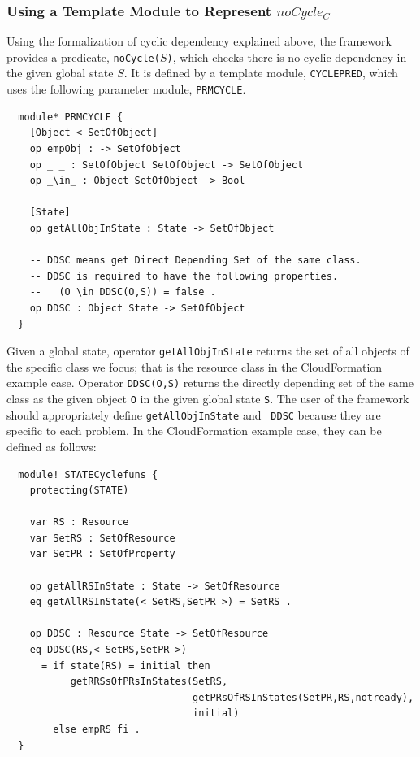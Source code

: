 \documentclass[12pt]{report}
\newcommand{\stt}[1]{{\small{\tt {#1}}}}
\begin{document}
\subsubsection{Using a Template Module to Represent $noCycle_C$}
Using the formalization of cyclic dependency explained above, the
framework provides a predicate, \stt{noCycle($S$)}, which checks there
is no cyclic dependency in the given global state $S$. It is defined
by a template module, {\tt CYCLEPRED}, which uses the following
parameter module, {\tt PRMCYCLE}.
\small
\begin{verbatim}
  module* PRMCYCLE {
    [Object < SetOfObject]
    op empObj : -> SetOfObject
    op _ _ : SetOfObject SetOfObject -> SetOfObject
    op _\in_ : Object SetOfObject -> Bool
  
    [State]
    op getAllObjInState : State -> SetOfObject
  
    -- DDSC means get Direct Depending Set of the same class.
    -- DDSC is required to have the following properties.
    --   (O \in DDSC(O,S)) = false .
    op DDSC : Object State -> SetOfObject
  }
\end{verbatim}
\normalsize
Given a global state, operator {\tt getAllObjInState} returns the set
of all objects of the specific class we focus; that is the resource
class in the CloudFormation example case. Operator \stt{DDSC(O,S)}
returns the directly depending set of the same class as the given
object {\tt O} in the given global state {\tt S}. The user of the
framework should appropriately define {\tt getAllObjInState} and {\tt
  DDSC} because they are specific to each problem. In the
CloudFormation example case, they can be defined as follows:
\small
\begin{verbatim}
  module! STATECyclefuns {
    protecting(STATE)
  
    var RS : Resource
    var SetRS : SetOfResource
    var SetPR : SetOfProperty
  
    op getAllRSInState : State -> SetOfResource
    eq getAllRSInState(< SetRS,SetPR >) = SetRS .
  
    op DDSC : Resource State -> SetOfResource
    eq DDSC(RS,< SetRS,SetPR >)
      = if state(RS) = initial then
           getRRSsOfPRsInStates(SetRS,
                                getPRsOfRSInStates(SetPR,RS,notready),
                                initial)
        else empRS fi .
  }
\end{verbatim}
\end{document}
